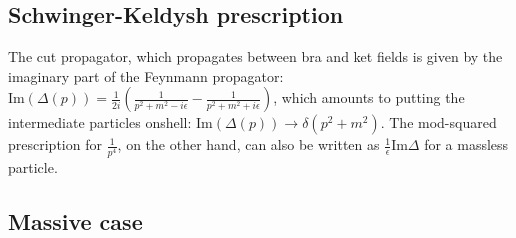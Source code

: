 \documentclass[aps,preprintnumbers,superscriptaddress,longbibliography]{revtex4-1}
\begin{document}
\subsection{Schwinger-Keldysh prescription}

\label{ss:SK}



The cut propagator, which propagates between bra and ket fields is given by the imaginary part of the Feynmann propagator: 
$\text{Im}(\Delta(p))=\frac{1}{2i}\left(\frac{1}{p^2+m^2-i\epsilon}-\frac{1}{p^2+m^2+i\epsilon}\right)$, which amounts to putting the intermediate particles onshell: $\text{Im}(\Delta(p))\rightarrow \delta(p^2+m^2)$. The mod-squared prescription for $\frac{1}{p^4}$, on the other hand, can also be written as $\frac{1}{\epsilon}\text{Im}\Delta$ for a massless particle.









\subsection{Massive case}
\end{document}
